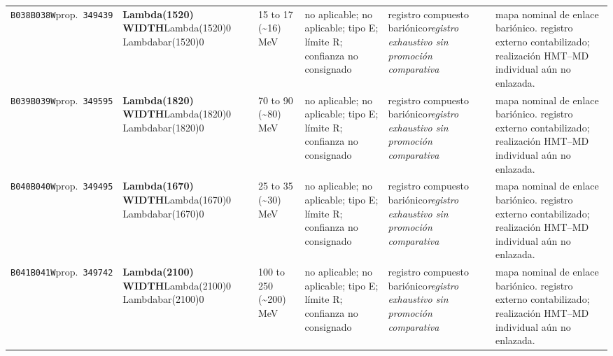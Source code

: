\begin{landscape}
\begin{longtable}{L{1.85cm}L{4.45cm}L{2.35cm}L{4.05cm}L{3.35cm}L{7.15cm}}
\texttt{B038}\newline \texttt{B038W}\newline prop.\ \texttt{349439} & \textbf{Lambda(1520) WIDTH}\newline Lambda(1520)0 \textbar{}\allowbreak{} Lambdabar(1520)0 & 15 to 17 (\textasciitilde{}16)\,MeV & no aplicable; no aplicable; tipo E; límite R; confianza no consignado & registro compuesto bariónico\newline \emph{registro exhaustivo sin promoción comparativa} & mapa nominal de enlace bariónico. registro externo contabilizado; realización HMT--MD individual aún no enlazada. \\
\texttt{B039}\newline \texttt{B039W}\newline prop.\ \texttt{349595} & \textbf{Lambda(1820) WIDTH}\newline Lambda(1820)0 \textbar{}\allowbreak{} Lambdabar(1820)0 & 70 to 90 (\textasciitilde{}80)\,MeV & no aplicable; no aplicable; tipo E; límite R; confianza no consignado & registro compuesto bariónico\newline \emph{registro exhaustivo sin promoción comparativa} & mapa nominal de enlace bariónico. registro externo contabilizado; realización HMT--MD individual aún no enlazada. \\
\texttt{B040}\newline \texttt{B040W}\newline prop.\ \texttt{349495} & \textbf{Lambda(1670) WIDTH}\newline Lambda(1670)0 \textbar{}\allowbreak{} Lambdabar(1670)0 & 25 to 35 (\textasciitilde{}30)\,MeV & no aplicable; no aplicable; tipo E; límite R; confianza no consignado & registro compuesto bariónico\newline \emph{registro exhaustivo sin promoción comparativa} & mapa nominal de enlace bariónico. registro externo contabilizado; realización HMT--MD individual aún no enlazada. \\
\texttt{B041}\newline \texttt{B041W}\newline prop.\ \texttt{349742} & \textbf{Lambda(2100) WIDTH}\newline Lambda(2100)0 \textbar{}\allowbreak{} Lambdabar(2100)0 & 100 to 250 (\textasciitilde{}200)\,MeV & no aplicable; no aplicable; tipo E; límite R; confianza no consignado & registro compuesto bariónico\newline \emph{registro exhaustivo sin promoción comparativa} & mapa nominal de enlace bariónico. registro externo contabilizado; realización HMT--MD individual aún no enlazada. \\

\end{longtable}
\end{landscape}
